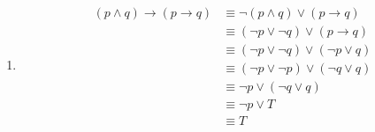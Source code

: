 \documentclass[12pt letter]{report}
\begin{document}
{\begin{enumerate}
\begin{align*}
                                                & \equiv T \tag*{By First Domination Law}
          \end{align*}
    \item
          \begin{align*}
            \left( p \wedge q \right)  \to	\left( p \to q \right) & \equiv \neg \left( p \wedge q \right) \vee
            \left( p \to q \right) \tag*{Conditional Disjunction Equivalence}                                            \\
                                                                  & \equiv \left( \neg p \vee \neg q \right) \vee
            \left( p \to q \right) \tag*{By First De Morgan's
            Law}                                                                                                         \\
                                                                  & \equiv \left( \neg p \vee \neg q \right) \vee
            \left( \neg p \vee q  \right) \tag*{Conditional
            Disjunction Equivalence}                                                                                     \\
                                                                  & \equiv \left( \neg p \vee \neg p \right) \vee \left(
            \neg q \vee q\right) \tag*{By First Associative Law}                                                         \\
                                                                  & \equiv \neg p \vee \left( \neg q \vee q \right)
            \tag*{By First Idempotent Law}                                                                               \\
                                                                  & \equiv \neg p \vee T \tag*{By First Negation Law}    \\
                                                                  & \equiv T \tag*{By First Domination Law}
          \end{align*}
  \end{enumerate}
}

\pagebreak
{}
\end{document}
